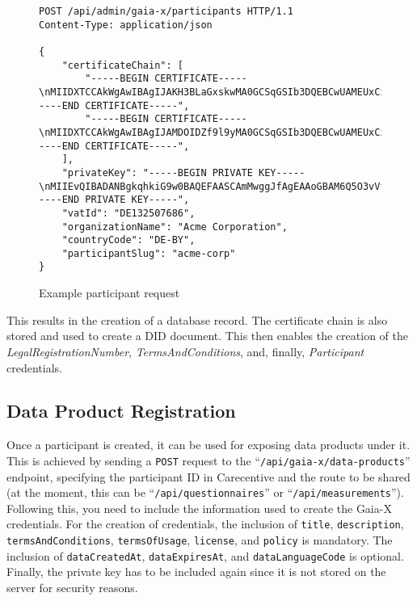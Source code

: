 \begin{figure}
    \centering
    \begin{verbatim}
POST /api/admin/gaia-x/participants HTTP/1.1
Content-Type: application/json

{
	"certificateChain": [
		"-----BEGIN CERTIFICATE-----\nMIIDXTCCAkWgAwIBAgIJAKH3BLaGxskwMA0GCSqGSIb3DQEBCwUAMEUxCzAJBgNV\n...\nJmCVzwB/MCuv3z4IV0IsbP5ZKh+6m0oI+RINdDl4Stxdj6LK8JspNeU0R6mBg1A=\n-----END CERTIFICATE-----",
		"-----BEGIN CERTIFICATE-----\nMIIDXTCCAkWgAwIBAgIJAMDOIDZf9l9yMA0GCSqGSIb3DQEBCwUAMEUxCzAJBgNV\n...\nv5pXVIlZm8DtRmDTUp8pNDnQ5UAZTuDPaWo3zbxZPOUmGJ1IlBOgaQvsyPCW5gU=\n-----END CERTIFICATE-----",
	],
	"privateKey": "-----BEGIN PRIVATE KEY-----\nMIIEvQIBADANBgkqhkiG9w0BAQEFAASCAmMwggJfAgEAAoGBAM6Q5O3vVfnxk6P7\n...\nYWw+HiFJh9XQpRUtv9PV8L8AqFFfMdsOpT6pgC+aA/WB\n-----END PRIVATE KEY-----",
	"vatId": "DE132507686",
	"organizationName": "Acme Corporation",
	"countryCode": "DE-BY",
	"participantSlug": "acme-corp"
}
    \end{verbatim}
    \caption{Example participant request}\label{fig:participant_req}
\end{figure}

This results in the creation of a database record.
The certificate chain is also stored and used to create a DID document.
This then enables the creation of the \textit{LegalRegistrationNumber}, \textit{TermsAndConditions}, and, finally, \textit{Participant} credentials.

\subsection{Data Product Registration}\label{subsec:data-product-registration}

Once a participant is created, it can be used for exposing data products under it.
This is achieved by sending a \texttt{POST} request to the ``\texttt{/api/gaia-x/data-products}'' endpoint, specifying the participant ID in Carecentive and the route to be shared (at the moment, this can be ``\texttt{/api/questionnaires}'' or ``\texttt{/api/measurements}'').
Following this, you need to include the information used to create the Gaia-X credentials.
For the creation of credentials, the inclusion of \texttt{title}, \texttt{description}, \texttt{termsAndConditions}, \texttt{termsOfUsage}, \texttt{license}, and \texttt{policy} is mandatory.
The inclusion of \texttt{dataCreatedAt}, \texttt{dataExpiresAt}, and \texttt{dataLanguageCode} is optional.
Finally, the private key has to be included again since it is not stored on the server for security reasons.

